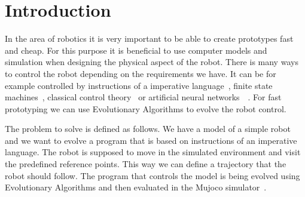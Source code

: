 \documentclass{ExcelAtFIT}
\affiliation{*%
  \href{mailto:xfajku06@stud.fit.vutbr.cz}{xfajku06@stud.fit.vutbr.cz},
  \textit{Faculty of Information Technology, Brno University of Technology}}
\begin{document}
\startdocument



\section{Introduction}
In the area of robotics it is very important to be able to create prototypes fast and cheap.
For this purpose it is beneficial to use computer models and simulation when designing the physical aspect of the robot.
There is many ways to control the robot depending on the requirements we have.
It can be for example controlled by instructions of a imperative language~\cite{Wollf2007}, finite state machines~\cite{Hodgins1996}, classical control theory~\cite{Mita1984} or artificial neural networks~\cite{Reil2002}~\cite{Lewis1996}.
For fast prototyping we can use Evolutionary Algorithms to evolve the robot control.


The problem to solve is defined as follows.
We have a model of a simple robot and we want to evolve a program that is based on instructions of an imperative language.
The robot is supposed to move in the simulated environment and visit the predefined reference points.
This way we can define a trajectory that the robot should follow.
The program that controls the model is being evolved using Evolutionary Algorithms and then evaluated in the Mujoco simulator~\cite{Todorov2012}.
\end{document}
